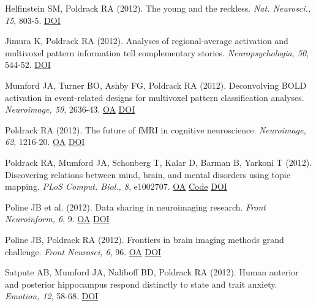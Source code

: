 Helfinstein SM, Poldrack RA (2012). The young and the reckless. \textit{Nat. Neurosci., 15}, 803-5. \href{http://dx.doi.org/10.1038/nn.3116}{DOI} \vspace{2mm}

Jimura K, Poldrack RA (2012). Analyses of regional-average activation and multivoxel pattern information tell complementary stories. \textit{Neuropsychologia, 50}, 544-52. \href{http://dx.doi.org/10.1016/j.neuropsychologia.2011.11.007}{DOI} \vspace{2mm}

Mumford JA, Turner BO, Ashby FG, Poldrack RA (2012). Deconvolving BOLD activation in event-related designs for multivoxel pattern classification analyses. \textit{Neuroimage, 59}, 2636-43. \href{https://www.ncbi.nlm.nih.gov/pmc/articles/PMC3251697}{OA} \href{http://dx.doi.org/10.1016/j.neuroimage.2011.08.076}{DOI} \vspace{2mm}

Poldrack RA (2012). The future of fMRI in cognitive neuroscience. \textit{Neuroimage, 62}, 1216-20. \href{https://www.ncbi.nlm.nih.gov/pmc/articles/PMC4131441}{OA} \href{http://dx.doi.org/10.1016/j.neuroimage.2011.08.007}{DOI} \vspace{2mm}

Poldrack RA, Mumford JA, Schonberg T, Kalar D, Barman B, Yarkoni T (2012). Discovering relations between mind, brain, and mental disorders using topic mapping. \textit{PLoS Comput. Biol., 8}, e1002707. \href{https://www.ncbi.nlm.nih.gov/pmc/articles/PMC3469446}{OA} \href{https://github.com/poldrack/LatentStructure}{Code} \href{http://dx.doi.org/10.1371/journal.pcbi.1002707}{DOI} \vspace{2mm}

Poline JB et al. (2012). Data sharing in neuroimaging research. \textit{Front Neuroinform, 6}, 9. \href{https://www.ncbi.nlm.nih.gov/pmc/articles/PMC3319918}{OA} \href{http://dx.doi.org/10.3389/fninf.2012.00009}{DOI} \vspace{2mm}

Poline JB, Poldrack RA (2012). Frontiers in brain imaging methods grand challenge. \textit{Front Neurosci, 6}, 96. \href{https://www.ncbi.nlm.nih.gov/pmc/articles/PMC3390895}{OA} \href{http://dx.doi.org/10.3389/fnins.2012.00096}{DOI} \vspace{2mm}

Satpute AB, Mumford JA, Naliboff BD, Poldrack RA (2012). Human anterior and posterior hippocampus respond distinctly to state and trait anxiety. \textit{Emotion, 12}, 58-68. \href{http://dx.doi.org/10.1037/a0026517}{DOI} \vspace{2mm}

